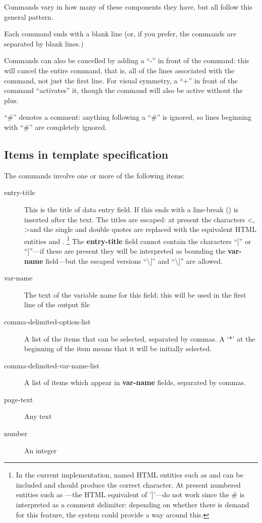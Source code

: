 \documentclass[letterpaper,10pt,english]{sphinxmanual}
\begin{document}
Commands vary in how many of these components they have, but all follow
this general pattern.

Each command ends with a blank line (or, if you prefer, the commands are
separated by blank lines.)

Commands can also be cancelled by adding a “-” in front of the command:
this will cancel the entire command, that is, all of the lines
associated with the command, not just the first line. For visual
symmetry, a “+” in front of the command “activates” it, though the
command will also be active without the plus.

“\#” denotes a comment: anything following a “\#” is ignored, so lines
beginning with “\#” are completely ignored.


\subsection{Items in template specification}
\label{forms:items-in-template-specification}
The commands involve one or more of the following items:
\begin{description}
\item[{entry-title}] \leavevmode
This is the title of data entry field. If this ends with \code{/} a
line-break () is inserted after the text. The titles are
escaped: at present the characters \textless{}, \textgreater{}and the single and double
quotes are replaced with the equivalent HTML entities
 and . \footnote{
In the current implementation, named HTML entities such as 
and  can be included and should produce the correct
character. At present numbered entities such as —the HTML
equivalent of ’{]}’—do not work since the \# is interpreted as a comment
delimiter: depending on whether there is demand for this feature, the
system could provide a way around this.
} The \textbf{entry-title}
field cannot contain the characters “{[}” or “{]}”—if these are present
they will be interpreted as bounding the \textbf{var-name} field—but the
escaped versions “\textbackslash{}{[}” and “\textbackslash{}{]}” are allowed.

\item[{var-name}] \leavevmode
The text of the variable name for this field; this will be used in
the first line of the  output file

\item[{comma-delimited-option-list}] \leavevmode
A list of the items that can be selected, separated by commas. A
‘*’ at the beginning of the item means that it will be initially
selected.

\item[{comma-delimited-var-name-list}] \leavevmode
A list of items which appear in \textbf{var-name} fields, separated by
commas.

\item[{page-text}] \leavevmode
Any text

\item[{number}] \leavevmode
An integer

\end{description}
\end{document}
